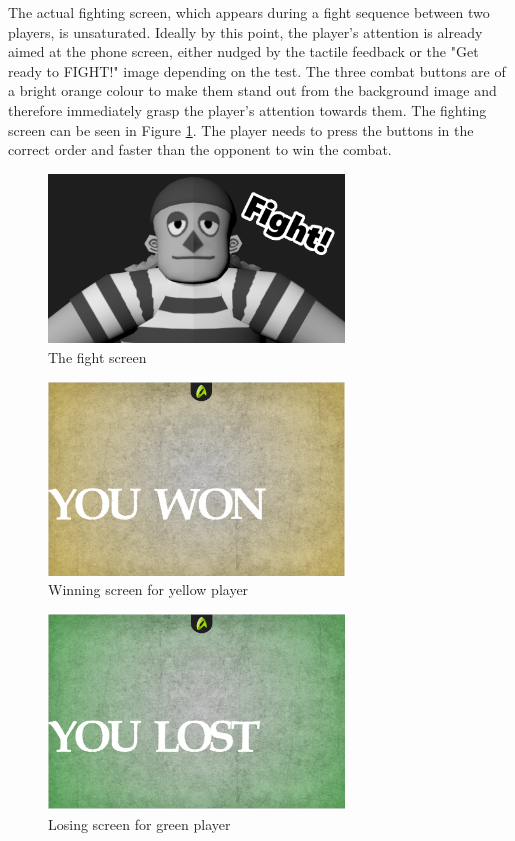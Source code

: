 The actual fighting screen, which appears during a fight sequence between two players, is unsaturated. Ideally by this point, the player's attention is already aimed at the phone screen, either nudged by the tactile feedback or the "Get ready to FIGHT!" image depending on the test. The three combat buttons are of a bright orange colour to make them stand out from the background image and therefore immediately grasp the player's attention towards them. The fighting screen can be seen in Figure \ref{fig:fight}. The player needs to press the buttons in the correct order and faster than the opponent to win the combat. 

\begin{figure}[h!]
	\centering
	\includegraphics[width=0.7\textwidth]{figures/fight.png}
	\caption{The fight screen}
	\label{fig:fight}
\end{figure}

\begin{figure}[h!]
	\centering
	\includegraphics[width=0.7\textwidth]{figures/WonPhone}
	\caption{Winning screen for yellow player}
	\label{fig:winning}
\end{figure}

\begin{figure}[h!]
	\centering
	\includegraphics[width=0.7\textwidth]{figures/LostPhone}
	\caption{Losing screen for green player}
	\label{fig:losing}
\end{figure}

